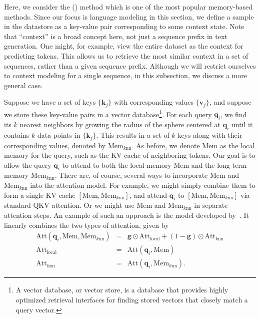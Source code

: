 Here, we consider the  () method which is one of the most popular memory-based methods. Since our focus is language modeling in this section, we define a sample in the datastore as a key-value pair corresponding to some context state. Note that ``context'' is a broad concept here, not just a sequence prefix in text generation. One might, for example, view the entire dataset as the context for predicting tokens. This allows us to retrieve the most similar context in a set of sequences, rather than a given sequence prefix. Although we will restrict ourselves to context modeling for a single sequence, in this subsection, we discuss a more general case.

Suppose we have a set of keys $\{\mathbf{k}_j\}$ with corresponding values $\{\mathbf{v}_j\}$, and suppose we store these key-value pairs in a vector database\footnote{A vector database, or vector store, is a database that provides highly optimized retrieval interfaces for finding stored vectors that closely match a query vector.}. For each query $\mathbf{q}_{i}$, we find its $k$ nearest neighbors by growing the radius of the sphere centered at $\mathbf{q}_i$ until it contains $k$ data points in $\{\mathbf{k}_j\}$. This results in a set of $k$ keys along with their corresponding values, denoted by $\mathrm{Mem}_{k\mathrm{nn}}$.  As before, we denote $\mathrm{Mem}$ as the local memory for the query, such as the KV cache of neighboring tokens. Our goal is to allow the query $\mathbf{q}_i$ to attend to both the local memory $\mathrm{Mem}$ and the long-term memory $\mathrm{Mem}_{k\mathrm{nn}}$. There are, of course, several ways to incorporate $\mathrm{Mem}$ and $\mathrm{Mem}_{k\mathrm{nn}}$ into the attention model. For example, we might simply combine them to form a single KV cache $[\mathrm{Mem},\mathrm{Mem}_{k\mathrm{nn}}]$, and attend $\mathbf{q}_i$ to $[\mathrm{Mem},\mathrm{Mem}_{k\mathrm{nn}}]$ via standard QKV attention. Or we might use $\mathrm{Mem}$ and $\mathrm{Mem}_{k\mathrm{nn}}$ in separate attention steps. An example of such an approach is the model developed by~\citet{wu-etal:2021memorizing}. It linearly combines the two types of attention, given by
\begin{eqnarray}
\mathrm{Att}(\mathbf{q}_i,\mathrm{Mem},\mathrm{Mem}_{k\mathrm{nn}}) & = & \mathbf{g} \odot \mathrm{Att}_{\mathrm{local}} + (1 - \mathbf{g}) \odot \mathrm{Att}_{k\mathrm{nn}} \\
\mathrm{Att}_{\mathrm{local}} & = & \mathrm{Att}(\mathbf{q}_i,\mathrm{Mem}) \\
\mathrm{Att}_{k\mathrm{nn}} & = & \mathrm{Att}(\mathbf{q}_i,\mathrm{Mem}_{k\mathrm{nn}}).
\end{eqnarray}

